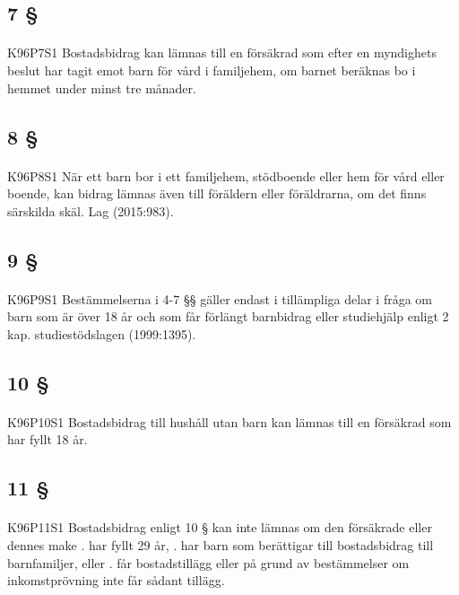 \documentclass[a4paper,notitlepage,openany,10pt]{book}
\begin{document}
\subsection*{7 §}
\paragraph*{}
{\tiny K96P7S1}
Bostadsbidrag kan lämnas till en försäkrad som efter en myndighets beslut har tagit emot barn för vård i familjehem, om barnet beräknas bo i hemmet under minst tre månader.
\subsection*{8 §}
\paragraph*{}
{\tiny K96P8S1}
När ett barn bor i ett familjehem, stödboende eller hem för vård eller boende, kan bidrag lämnas även till föräldern eller föräldrarna, om det finns särskilda skäl.
Lag (2015:983).
\subsection*{9 §}
\paragraph*{}
{\tiny K96P9S1}
Bestämmelserna i 4-7 §§ gäller endast i tillämpliga delar i fråga om barn som är över 18 år och som får förlängt barnbidrag eller studiehjälp enligt 2 kap. studiestödslagen (1999:1395).
\subsection*{10 §}
\paragraph*{}
{\tiny K96P10S1}
Bostadsbidrag till hushåll utan barn kan lämnas till en försäkrad som har fyllt 18 år.
\subsection*{11 §}
\paragraph*{}
{\tiny K96P11S1}
Bostadsbidrag enligt 10 § kan inte lämnas om den försäkrade eller dennes make
. har fyllt 29 år,
. har barn som berättigar till bostadsbidrag till barnfamiljer, eller
. får bostadstillägg eller på grund av bestämmelser om inkomstprövning inte får sådant tillägg.
\end{document}

